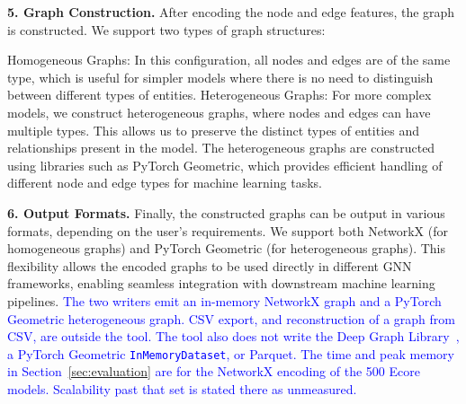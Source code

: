 \documentclass[journal,article,submit,moreauthors,technologies]{Definitions/mdpi}
\newcommand{\rev}[1]{\textcolor{blue}{#1}}
\begin{document}
\textbf{5. Graph Construction.}
After encoding the node and edge features, the graph is constructed. We support two types of graph structures:

Homogeneous Graphs: In this configuration, all nodes and edges are of the same type, which is useful for simpler models where there is no need to distinguish between different types of entities.
Heterogeneous Graphs: For more complex models, we construct heterogeneous graphs, where nodes and edges can have multiple types. This allows us to preserve the distinct types of entities and relationships present in the model. The heterogeneous graphs are constructed using libraries such as PyTorch Geometric, which provides efficient handling of different node and edge types for machine learning tasks.

\textbf{6. Output Formats.}
Finally, the constructed graphs can be output in various formats, depending on the user's requirements. We support both NetworkX (for homogeneous graphs) and PyTorch Geometric (for heterogeneous graphs). This flexibility allows the encoded graphs to be used directly in different GNN frameworks, enabling seamless integration with downstream machine learning pipelines.
\rev{The two writers emit an in-memory NetworkX graph and a PyTorch Geometric heterogeneous graph. CSV export, and reconstruction of a graph from CSV, are outside the tool. The tool also does not write the Deep Graph Library~\cite{wang2019deep}, a PyTorch Geometric \texttt{InMemoryDataset}, or Parquet. The time and peak memory in Section~\ref{sec:evaluation} are for the NetworkX encoding of the 500 Ecore models. Scalability past that set is stated there as unmeasured.}
\end{document}
